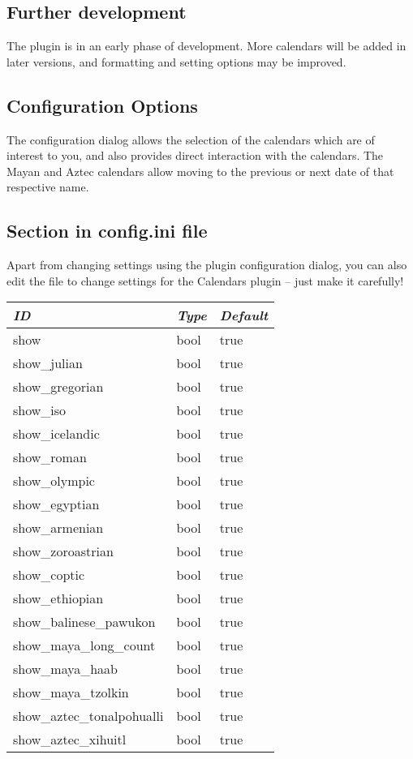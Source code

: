 \subsection{Further development}
The plugin is in an early phase of development. More calendars will be
added in later versions, and formatting and setting options may be
improved.


\subsection{Configuration Options}
\label{sec:plugin:Calendars:configuration}

The configuration dialog allows the selection of the calendars which are
of interest to you, and also provides direct interaction with the calendars.
The Mayan and Aztec calendars allow moving to the previous or next date of that respective name. 

\subsection*{Section  in config.ini file}

Apart from changing settings using the plugin configuration dialog,
you can also edit the  file to change
settings for the Calendars plugin -- just make it carefully!

\begin{longtable}{l|l|l}\toprule
\emph{ID}                      &\emph{Type} & \emph{Default}  \\\midrule
show                         &bool & true\\\midrule
show\_julian                 &bool & true\\
show\_gregorian              &bool & true\\
show\_iso                    &bool & true\\
show\_icelandic              &bool & true\\\midrule
show\_roman                  &bool & true\\
show\_olympic                &bool & true\\
show\_egyptian               &bool & true\\
show\_armenian               &bool & true\\
show\_zoroastrian            &bool & true\\
show\_coptic                 &bool & true\\
show\_ethiopian              &bool & true\\\midrule
show\_balinese\_pawukon      &bool & true\\\midrule
show\_maya\_long\_count      &bool & true\\
show\_maya\_haab             &bool & true\\
show\_maya\_tzolkin          &bool & true\\
show\_aztec\_tonalpohualli   &bool & true\\
show\_aztec\_xihuitl         &bool & true\\\bottomrule
\end{longtable}

